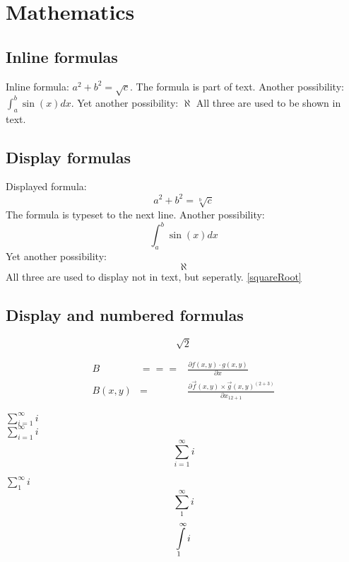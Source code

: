 \pagebreak
\section{Mathematics}
\subsection{Inline formulas}
Inline formula:
$a^2+b^2=\sqrt{c}$. The formula is part of text. Another possibility: 
\(\int_a^b\sin(x)dx\). Yet another possibility:
\begin{math}
    \aleph
\end{math}
All three are used to be shown in text.

\subsection{Display formulas}
Displayed formula:
$$a^2+b^2=\sqrt[b]{c}$$ The formula is typeset to the next line. Another possibility: 
\[\int_a^b\sin(x)dx\] Yet another possibility:
\begin{displaymath}
    \aleph
\end{displaymath}
All three are used to display not in text, but seperatly.
\ref{squareRoot} %

\subsection{Display and numbered formulas}
\begin{equation}
    \sqrt{2} \label{squareRoot}
\end{equation}

\begin{eqnarray}
    B&===&\frac{\partial f(x,y)\cdot g(x,y)}{\partial x}\\
    B(x,y)&=&\frac{\partial \vec{f}(x,y)
    \times\vec{g}(x,y)^{(2+3)}}{\partial x_{12+1}}
\end{eqnarray}

$\sum_{i=1}^{\infty} i$\\
$\displaystyle\sum_{i=1}^{\infty} i$
$$\sum_{i=1}^{\infty} i$$

$\sum_{1}^{\infty} i$
$$\sum_{1}^{\infty} i$$
$$\intop_{1}^{\infty} i$$